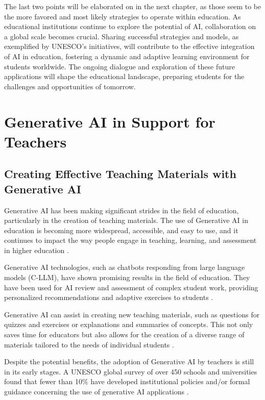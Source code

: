 \documentclass[a4paper,12pt]{report}
\begin{document}
The last two points will be elaborated on in the next chapter, as those seem to be the more favored and most likely strategies to operate within education. As educational institutions continue to explore the potential of AI, collaboration on a global scale becomes crucial. Sharing successful strategies and models, as exemplified by UNESCO's initiatives, will contribute to the effective integration of AI in education, fostering a dynamic and adaptive learning environment for students worldwide. The ongoing dialogue and exploration of these future applications will shape the educational landscape, preparing students for the challenges and opportunities of tomorrow.
\newpage

\chapter{Generative AI in Support for Teachers} \label{chap:teachers}
\newpage
\section{Creating Effective Teaching Materials with Generative AI} \label{sect:materials}
\hspace{10mm} Generative AI has been making significant strides in the field of education, particularly in the creation of teaching materials. The use of Generative AI in education is becoming more widespread, accessible, and easy to use, and it continues to impact the way people engage in teaching, learning, and assessment in higher education \cite{genai-use}.

Generative AI technologies, such as chatbots responding from large language models (C-LLM), have shown promising results in the field of education. They have been used for AI review and assessment of complex student work, providing personalized recommendations and adaptive exercises to students \cite{genai-implications}.

Generative AI can assist in creating new teaching materials, such as questions for quizzes and exercises or explanations and summaries of concepts. This not only saves time for educators but also allows for the creation of a diverse range of materials tailored to the needs of individual students \cite{genai-usecases}.

Despite the potential benefits, the adoption of Generative AI by teachers is still in its early stages. A UNESCO global survey of over 450 schools and universities found that fewer than 10\% have developed institutional policies and/or formal guidance concerning the use of generative AI applications \cite{unesco-survey}.
\end{document}
